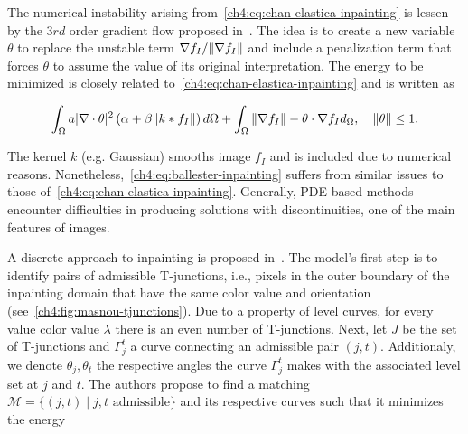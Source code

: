 The numerical instability arising from~\cref{ch4:eq:chan-elastica-inpainting} is lessen by the $3rd$ order gradient flow proposed in~\cite{ballester01filling}. The idea is to create a new variable $\theta$ to replace the unstable term $\nabla f_I / \lVert\nabla f_I\rVert$ and include a penalization term that forces $\theta$ to assume the value of its original interpretation. The energy to be minimized is closely related to~\cref{ch4:eq:chan-elastica-inpainting} and is written as

\begin{align}
	\int_{\Omega}{a|\nabla \cdot \theta|^2\left(\alpha + \beta \lVert k * f_I\rVert\right)d\Omega} + \int_{\Omega}{ \lVert\nabla f_I\rVert - \theta \cdot \nabla f_I d_{\Omega}},\quad \lVert\theta\rVert \leq 1.
	\label{ch4:eq:ballester-inpainting}
\end{align}

The kernel $k$ (e.g. Gaussian) smooths image $f_I$ and is included due to numerical reasons. Nonetheless,~\cref{ch4:eq:ballester-inpainting} suffers from similar issues to those of~\cref{ch4:eq:chan-elastica-inpainting}. Generally, PDE-based methods encounter difficulties in producing solutions with discontinuities, one of the main features of images.

A discrete approach to inpainting is proposed in~\cite{masnou98inpainting}. The model's first step is to identify pairs of admissible T-junctions, i.e., pixels in the outer boundary of the inpainting domain that have the same color value and orientation (see~\cref{ch4:fig:masnou-tjunctions}). Due to a property of level curves, for every value color value $\lambda$ there is an even number of T-junctions. Next, let $J$ be the set of T-junctions and $\Gamma_j^t$ a curve connecting an admissible pair $(j,t)$. Additionaly, we denote $\theta_j,\theta_t$ the respective angles the curve $\Gamma_j^t$ makes with the associated level set at $j$ and $t$. The authors propose to find a matching $\mathcal{M}=\{ (j,t) \; | \; j,t\text{ admissible} \}$ and its respective curves such that it minimizes the energy

